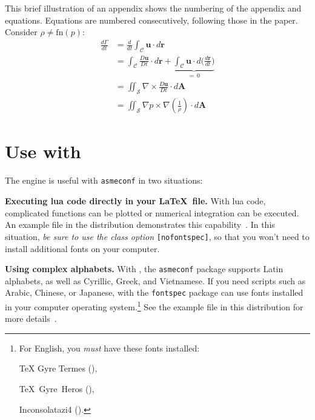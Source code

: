 \documentclass[captionpatch,colorlinks,upint,subscriptcorrection,varvw,german]{asmeconf}
\begin{document}
This brief illustration of an appendix shows the numbering of the appendix and equations. Equations are numbered
consecutively, following those in the paper. Consider $\rho \neq \textrm{fn}(p)$:
\begin{align}
\frac{d\Gamma}{dt} &{}= \frac{d}{dt} \int_{\mathcal{C}} \mathbf{u} \cdot d\mathbf{r}\\
				   &{}= \int_{\mathcal{C}} \frac{D\mathbf{u}}{Dt} \cdot d\mathbf{r} + \underbrace{\int_{\mathcal{C}} \mathbf{u}\cdot d\biggl( \frac{d\mathbf{r}}{dt}\biggr)}_{=\, 0} \\[-2pt]
                   &{}= \iint_{\mathcal{S}} \nabla \times \frac{D\mathbf{u}}{Dt}  \cdot d\mathbf{A}\\
                   &{}= \iint_{\mathcal{S}}  \nabla p \times \nabla \left( \frac{1}{\rho}\right) \cdot d\mathbf{A}
\end{align}

\section[Use with LuaLaTeX]{Use with }\label{appendix:b}

The  engine is useful with \texttt{asmeconf} in two situations:

\begin{description}

\item \textbf{Executing lua code directly in your \LaTeX\ file.} With lua code, complicated functions can be plotted or numerical integration can be executed. An example file in the distribution demonstrates this capability~\cite{lienhard2024}. In this situation, \textit{be sure to use the class option} \texttt{[nofontspec]}, so that you won't need to install additional fonts on your computer.

\item \textbf{Using complex alphabets.} With , the \texttt{asmeconf} package supports Latin alphabets, as well as Cyrillic, Greek, and Vietnamese. If you need scripts such as Arabic, Chinese, or Japanese,  with the \texttt{fontspec} package can use fonts installed in your computer operating system.\footnote{For English, you \textit{must} have these fonts installed:\par \parbox{\columnwidth}{\setlength{\parindent}{12pt}TeX Gyre Termes (),\par TeX~Gyre~Heros (),\par
Inconsolatazi4 ().}} See the example file in this distribution for more details~\cite{lienhard2021}.


\end{description}
\end{document}

